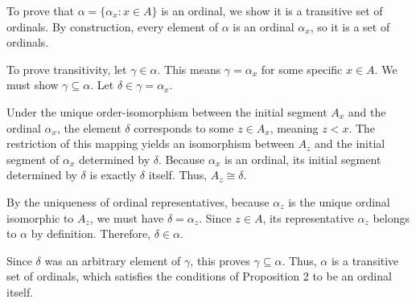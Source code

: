 To prove that $\alpha = \{\alpha_x : x \in A\}$ is an ordinal, we show it is a transitive set of ordinals. By construction, every element of $\alpha$ is an ordinal $\alpha_x$, so it is a set of ordinals. 

To prove transitivity, let $\gamma \in \alpha$. This means $\gamma = \alpha_x$ for some specific $x \in A$. We must show $\gamma \subseteq \alpha$. Let $\delta \in \gamma = \alpha_x$. 

Under the unique order-isomorphism between the initial segment $A_x$ and the ordinal $\alpha_x$, the element $\delta$ corresponds to some $z \in A_x$, meaning $z < x$. The restriction of this mapping yields an isomorphism between $A_z$ and the initial segment of $\alpha_x$ determined by $\delta$. Because $\alpha_x$ is an ordinal, its initial segment determined by $\delta$ is exactly $\delta$ itself. Thus, $A_z \cong \delta$.

By the uniqueness of ordinal representatives, because $\alpha_z$ is the unique ordinal isomorphic to $A_z$, we must have $\delta = \alpha_z$. Since $z \in A$, its representative $\alpha_z$ belongs to $\alpha$ by definition. Therefore, $\delta \in \alpha$. 

Since $\delta$ was an arbitrary element of $\gamma$, this proves $\gamma \subseteq \alpha$. Thus, $\alpha$ is a transitive set of ordinals, which satisfies the conditions of Proposition 2 to be an ordinal itself.